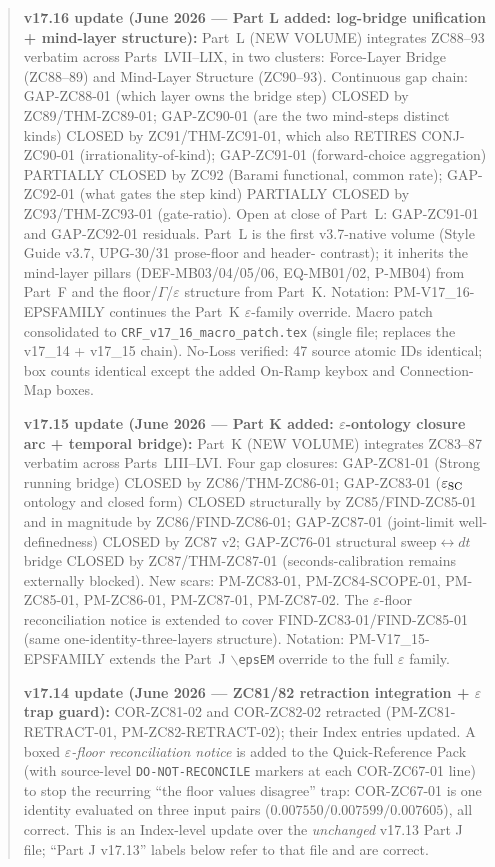 \documentclass[11pt, a4paper]{article}
\begin{document}
\begin{abstract}
\textbf{v17.16 update (June 2026 --- Part L added: log-bridge unification
+ mind-layer structure):}
Part~L (NEW VOLUME) integrates ZC88--93 verbatim across Parts~LVII--LIX,
in two clusters: Force-Layer Bridge (ZC88--89) and Mind-Layer Structure
(ZC90--93). Continuous gap chain: GAP-ZC88-01 (which layer owns the bridge
step) CLOSED by ZC89/THM-ZC89-01; GAP-ZC90-01 (are the two mind-steps
distinct kinds) CLOSED by ZC91/THM-ZC91-01, which also RETIRES CONJ-ZC90-01
(irrationality-of-kind); GAP-ZC91-01 (forward-choice aggregation) PARTIALLY
CLOSED by ZC92 (Barami functional, common rate); GAP-ZC92-01 (what gates the
step kind) PARTIALLY CLOSED by ZC93/THM-ZC93-01 (gate-ratio). Open at close
of Part~L: GAP-ZC91-01 and GAP-ZC92-01 residuals. Part~L is the first
v3.7-native volume (Style Guide v3.7, UPG-30/31 prose-floor and header-
contrast); it inherits the mind-layer pillars (DEF-MB03/04/05/06, EQ-MB01/02,
P-MB04) from Part~F and the floor/$\Gamma$/$\varepsilon$ structure from
Part~K. Notation: PM-V17\_16-EPSFAMILY continues the Part~K
$\varepsilon$-family override. Macro patch consolidated to
\texttt{CRF\_v17\_16\_macro\_patch.tex} (single file; replaces the
v17\_14 + v17\_15 chain). No-Loss verified: 47 source atomic IDs identical;
box counts identical except the added On-Ramp keybox and Connection-Map boxes.

\textbf{v17.15 update (June 2026 --- Part K added: $\varepsilon$-ontology
closure arc + temporal bridge):}
Part~K (NEW VOLUME) integrates ZC83--87 verbatim across Parts~LIII--LVI.
Four gap closures: GAP-ZC81-01 (Strong running bridge) CLOSED by
ZC86/THM-ZC86-01; GAP-ZC83-01 ($\varepsilon_{\rm SC}$ ontology and closed
form) CLOSED structurally by ZC85/FIND-ZC85-01 and in magnitude by
ZC86/FIND-ZC86-01; GAP-ZC87-01 (joint-limit well-definedness) CLOSED by
ZC87 v2; GAP-ZC76-01 structural sweep$\leftrightarrow dt$ bridge CLOSED by
ZC87/THM-ZC87-01 (seconds-calibration remains externally blocked). New
scars: PM-ZC83-01, PM-ZC84-SCOPE-01, PM-ZC85-01, PM-ZC86-01, PM-ZC87-01,
PM-ZC87-02. The $\varepsilon$-floor reconciliation notice is extended to
cover FIND-ZC83-01/FIND-ZC85-01 (same one-identity-three-layers
structure). Notation: PM-V17\_15-EPSFAMILY extends the Part~J
$\backslash$\texttt{epsEM} override to the full $\varepsilon$ family.

\textbf{v17.14 update (June 2026 --- ZC81/82 retraction integration + $\varepsilon$ trap guard):}
COR-ZC81-02 and COR-ZC82-02 retracted (PM-ZC81-RETRACT-01,
PM-ZC82-RETRACT-02); their Index entries updated. A boxed
\emph{$\varepsilon$-floor reconciliation notice} is added to the
Quick-Reference Pack (with source-level \texttt{DO-NOT-RECONCILE} markers
at each COR-ZC67-01 line) to stop the recurring ``the floor values
disagree'' trap: COR-ZC67-01 is one identity evaluated on three input
pairs ($0.007550/0.007599/0.007605$), all correct. This is an
Index-level update over the \emph{unchanged} v17.13 Part J file;
``Part J v17.13'' labels below refer to that file and are correct.


\end{abstract}
\end{document}
